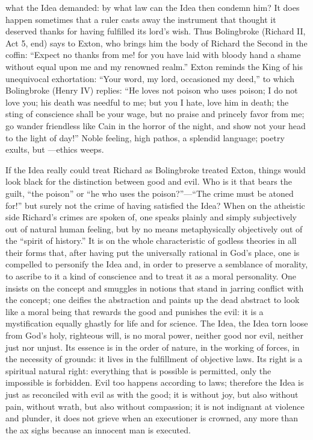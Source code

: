 \documentclass[12pt,a4paper,openany]{book}
\newcommand{\opage}[1]{\marginnote{\footnotesize\textit{[#1]}}}
\begin{document}
what the Idea demanded: by what law can the Idea then
condemn him? It does happen sometimes that a ruler
casts away the instrument that thought it deserved
thanks for having fulfilled its lord's wish. Thus
Bolingbroke (Richard II, Act 5, end) says to Exton,
who brings him the body of Richard the Second in the coffin:
``Expect no thanks from me! for you have laid with bloody
hand a shame without equal upon me and my renowned
realm.'' Exton reminds the King of his unequivocal
exhortation: ``Your word, my lord, occasioned my deed,''
to which Bolingbroke (Henry IV) replies: ``He loves
not poison who uses poison; I do not love you; his death was
needful to me; but you I hate, love him in death;
the sting of conscience shall be your wage, but no praise and
princely favor from me; go wander friendless like Cain in the horror
of the night, and show not your head to the light of day!'' Noble feeling,
high pathos, a splendid language; poetry exults, but
---ethics weeps.

If the Idea really could treat Richard as
Bolingbroke treated Exton, things would look black
for the distinction between good and evil. Who is it that bears
the guilt, ``the poison'' or ``he who uses the poison?''---``The crime
must be atoned for!'' but surely not the crime of
\setcounter{footnote}{0}%
\opage{550}having satisfied the Idea? When on the atheistic side
Richard's crimes are spoken of, one speaks plainly
and simply subjectively out of natural human feeling, but
by no means metaphysically objectively out of the ``spirit of history.''
It is on the whole characteristic of godless
theories in all their forms that, after having put
the universally rational in God's place, one is compelled to personify
the Idea and, in order to preserve a semblance of morality,
to ascribe to it a kind of conscience and to treat it as
a moral personality. One insists on the concept and smuggles in
notions that stand in jarring conflict with the concept;
one deifies the abstraction and paints up the dead
abstract to look like a moral being that
rewards the good and punishes the evil: it is a mystification
equally ghastly for life and for science. The Idea, the Idea torn loose from
God's holy, righteous will, is no
moral power, neither good nor evil, neither just
nor unjust. Its essence is in the order of nature, in
the working of forces, in the necessity of grounds: it lives
in the fulfillment of objective laws. Its right is a spiritual
natural right: everything that is possible is permitted, only the
impossible is forbidden. Evil too happens according to laws;
therefore the Idea is just as reconciled with evil as with
the good; it is without joy, but also without pain,
without wrath, but also without compassion; it is not indignant
at violence and plunder, it does not grieve when an executioner
is crowned, any more than the ax sighs because an innocent man
is executed.
\end{document}
